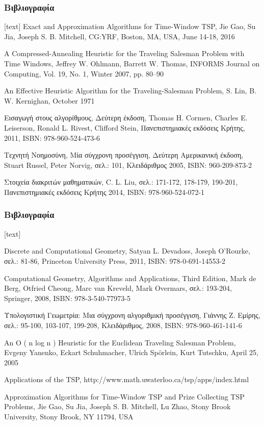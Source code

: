 \documentclass[xcolor=dvipsnames, 11pt]{beamer}
\begin{document}
\begin{frame}
	\frametitle{Βιβλιογραφία}
	\footnotesize
	\begin{thebibliography}{depth}
		Exact and Approximation Algorithms for Time-Window TSP, 
		Jie Gao, Su Jia, Joseph S. B. Mitchell,
		CG:YRF, Boston, MA, USA, June 14-18, 2016
		
		A Compressed-Annealing Heuristic for the Traveling Salesman Problem with Time Windows, 
		Jeffrey W. Ohlmann, Barrett W. Thomas,
		INFORMS Journal on Computing,
		Vol. 19, No. 1, Winter 2007, pp. 80–90
		
		An Effective Heuristic Algorithm for the Traveling-Salesman Problem,
		S. Lin, B. W. Kernighan,
		October 1971
		
		Εισαγωγή στους αλγορίθμους, Δεύτερη έκδοση, 
		Thomas H. Cormen, Charles E. Leiserson, Ronald L. Rivest, Clifford Stein,
		Πανεπιστημιακές εκδόσεις Κρήτης, 2011,
		ISBN: 978-960-524-473-6
		
		Τεχνητή Νοημοσύνη, Μία σύγχρονη προσέγγιση, Δεύτερη Αμερικανική έκδοση, 
		Stuart Russel, Peter Norvig,
		σελ.: 101,
		Κλειδάριθμος 2005,
		ISBN: 960-209-873-2
		
		Στοιχεία διακριτών μαθηματικών, 
		C. L. Liu,
		σελ.: 171-172, 178-179, 190-201,
		Πανεπιστημιακές εκδόσεις Κρήτης 2014, 
		ISBN: 978-960-524-072-1	
	\end{thebibliography}
\end{frame}

\begin{frame}
	\frametitle{Βιβλιογραφία}
	\footnotesize
	\begin{thebibliography}{depth}
		
		Discrete and Computational Geometry, 
		Satyan L. Devadoss, Joseph O'Rourke,
		σελ.: 81-86,
		Princeton University Press, 2011, 
		ISBN: 978-0-691-14553-2
		
		Computational Geometry,	Algorithms and Applications, Third Edition, 
		Mark de Berg, Otfried Cheong, Marc van Kreveld, Mark Overmars,
		σελ.: 193-204,
		Springer, 2008, 
		ISBN: 978-3-540-77973-5
		
		Υπολογιστική Γεωμετρία: Μια σύγχρονη αλγοριθμική προσέγγιση, 
		Γιάννης Ζ. Εμίρης,
		σελ.: 95-100, 103-107, 199-208,
		Κλειδάριθμος, 2008, 
		ISBN: 978-960-461-141-6 
		
		An O ( n log n ) Heuristic for the Euclidean Traveling Salesman Problem, 
		Evgeny Yanenko, Eckart
		Schuhmacher, Ulrich Spörlein, Kurt Tutschku,
		April 25, 2005
		
		Applications of the TSP,
		http://www.math.uwaterloo.ca/tsp/apps/index.html
		
		Approximation Algorithms for Time-Window
		TSP and Prize Collecting TSP Problems,
		Jie Gao, Su Jia, Joseph S. B. Mitchell, Lu Zhao,
		Stony Brook University, Stony Brook, NY 11794, USA
	\end{thebibliography}
\end{frame}
\end{document}
